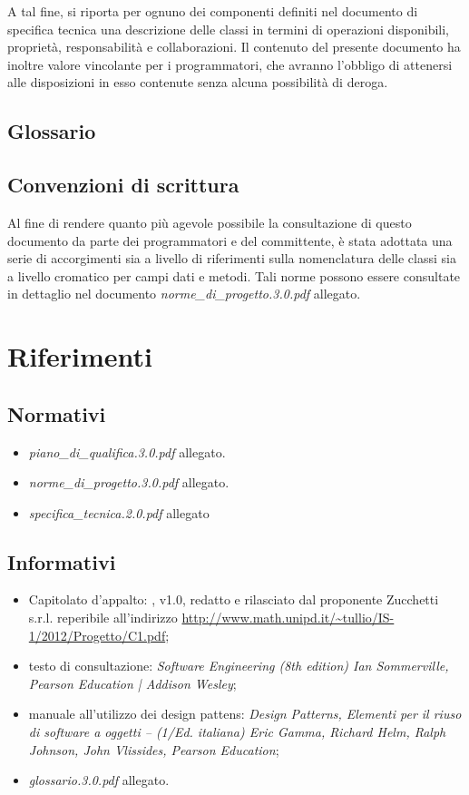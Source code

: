 A tal fine, si riporta per ognuno dei componenti definiti nel documento di specifica tecnica una descrizione delle classi in termini di operazioni disponibili, proprietà, responsabilità e collaborazioni. Il contenuto del presente documento ha inoltre valore vincolante per i programmatori, che avranno l'obbligo di attenersi alle disposizioni in esso contenute senza alcuna possibilità di deroga.

\subsection{Glossario}
\glossaryIntro

\subsection{Convenzioni di scrittura}
Al fine di rendere quanto più agevole possibile la consultazione di questo documento da parte dei programmatori e del committente, è stata adottata una serie di accorgimenti sia a livello di riferimenti sulla nomenclatura delle classi sia a livello cromatico per campi dati e metodi. 
Tali norme possono essere consultate in dettaglio nel documento \textit{norme\_di\_progetto.3.0.pdf} allegato.
\clearpage

\section{Riferimenti}
\subsection{Normativi}
\begin{itemize}
\item[] \textit{piano\_di\_qualifica.3.0.pdf} allegato.
\item[] \textit{norme\_di\_progetto.3.0.pdf} allegato.
\item[] \textit{specifica\_tecnica.2.0.pdf} allegato
\end{itemize}

\subsection{Informativi}
\begin{itemize}
\item[] Capitolato d'appalto: \caName{}, v1.0, redatto e rilasciato dal proponente Zucchetti s.r.l. reperibile all'indirizzo \url{http://www.math.unipd.it/~tullio/IS-1/2012/Progetto/C1.pdf};
\item[] testo di consultazione: \textit{Software Engineering (8th edition) Ian Sommerville, Pearson Education | Addison Wesley};
\item[] manuale all'utilizzo dei design pattens: \textit{Design Patterns, Elementi per il riuso di software a oggetti -- (1/Ed. italiana) Eric Gamma, Richard Helm, Ralph Johnson, John Vlissides, Pearson Education};
\item[] \textit{glossario.3.0.pdf} allegato.
\end{itemize}
\clearpage

